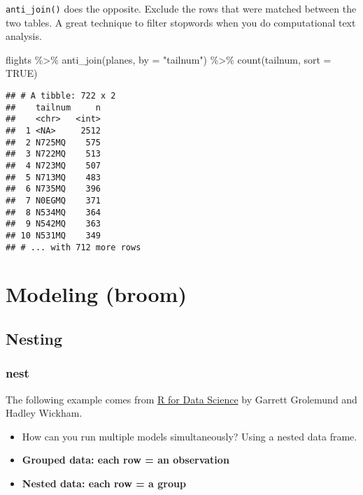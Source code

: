 \documentclass[
]{book}
\newenvironment{Shaded}{\begin{snugshade}}{\end{snugshade}}
\newcommand{\AttributeTok}[1]{\textcolor[rgb]{0.77,0.63,0.00}{#1}}
\newcommand{\ConstantTok}[1]{\textcolor[rgb]{0.00,0.00,0.00}{#1}}
\newcommand{\FunctionTok}[1]{\textcolor[rgb]{0.00,0.00,0.00}{#1}}
\newcommand{\NormalTok}[1]{#1}
\newcommand{\SpecialCharTok}[1]{\textcolor[rgb]{0.00,0.00,0.00}{#1}}
\newcommand{\StringTok}[1]{\textcolor[rgb]{0.31,0.60,0.02}{#1}}
\providecommand{\tightlist}{%
  \setlength{\itemsep}{0pt}\setlength{\parskip}{0pt}}
\begin{document}
\texttt{anti\_join()} does the opposite. Exclude the rows that were matched between the two tables. A great technique to filter stopwords when you do computational text analysis.

\begin{Shaded}
\begin{Highlighting}[]
\NormalTok{flights }\SpecialCharTok{\%\textgreater{}\%}
  \FunctionTok{anti\_join}\NormalTok{(planes, }\AttributeTok{by =} \StringTok{"tailnum"}\NormalTok{) }\SpecialCharTok{\%\textgreater{}\%}
  \FunctionTok{count}\NormalTok{(tailnum, }\AttributeTok{sort =} \ConstantTok{TRUE}\NormalTok{)}
\end{Highlighting}
\end{Shaded}

\begin{verbatim}
## # A tibble: 722 x 2
##    tailnum     n
##    <chr>   <int>
##  1 <NA>     2512
##  2 N725MQ    575
##  3 N722MQ    513
##  4 N723MQ    507
##  5 N713MQ    483
##  6 N735MQ    396
##  7 N0EGMQ    371
##  8 N534MQ    364
##  9 N542MQ    363
## 10 N531MQ    349
## # ... with 712 more rows
\end{verbatim}

\hypertarget{modeling-broom}{%
\section{Modeling (broom)}\label{modeling-broom}}

\hypertarget{nesting}{%
\subsection{Nesting}\label{nesting}}

\hypertarget{nest}{%
\subsubsection{nest}\label{nest}}

The following example comes from \href{https://r4ds.had.co.nz/many-models.html}{R for Data Science} by Garrett Grolemund and Hadley Wickham.

\begin{itemize}
\tightlist
\item
  How can you run multiple models simultaneously? Using a nested data frame.
\end{itemize}

\begin{itemize}
\item
  \textbf{Grouped data: each row = an observation}
\item
  \textbf{Nested data: each row = a group}
\end{itemize}
\end{document}
